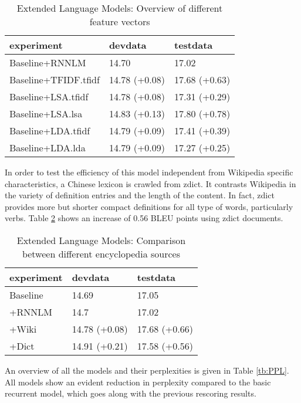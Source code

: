 \documentclass[a4paper]{article}
\begin{document}
\begin{table}
\caption{Extended Language Models: Overview of different feature vectors}
\centering
  \begin{tabular}{lll}
  	\hline
  	experiment           & devdata       & testdata      \\ \hline\hline
  	Baseline+RNNLM       & 14.70         & 17.02         \\ \hline
  	Baseline+TFIDF.tfidf & 14.78 (+0.08) & 17.68 (+0.63) \\
  	Baseline+LSA.tfidf   & 14.78 (+0.08) & 17.31 (+0.29) \\
  	Baseline+LSA.lsa     & 14.83 (+0.13) & 17.80 (+0.78) \\
  	Baseline+LDA.tfidf   & 14.79 (+0.09) & 17.41 (+0.39) \\
  	Baseline+LDA.lda     & 14.79 (+0.09) & 17.27 (+0.25)
  \end{tabular}
  \label{tb:zh-extended-diff-features}
\end{table}

In order to test the efficiency of this model independent from Wikipedia specific characteristics, a Chinese lexicon is crawled from zdict. It contrasts Wikipedia in the variety of definition entries and the length of the content. In fact, zdict provides more but shorter compact definitions for all type of words, particularly verbs. Table \ref{tb:zh-extended-diff-sources} shows an increase of 0.56 BLEU points using zdict documents.

\begin{table}
\caption{Extended Language Models: Comparison between different encyclopedia sources}
\centering
  \begin{tabular}{lll}
  	\hline
  	experiment & devdata       & testdata      \\ \hline\hline
  	Baseline   & 14.69         & 17.05         \\
  	+RNNLM     & 14.7          & 17.02         \\ \hline
  	+Wiki      & 14.78 (+0.08) & 17.68 (+0.66) \\
  	+Dict      & 14.91 (+0.21) & 17.58 (+0.56) \\ \hline
  \end{tabular}
  \label{tb:zh-extended-diff-sources}
\end{table}

An overview of all the models and their perplexities is given in Table \ref{tb:PPL}. All models show an evident reduction in perplexity compared to the basic recurrent model, which goes along with the previous rescoring results.
\end{document}
